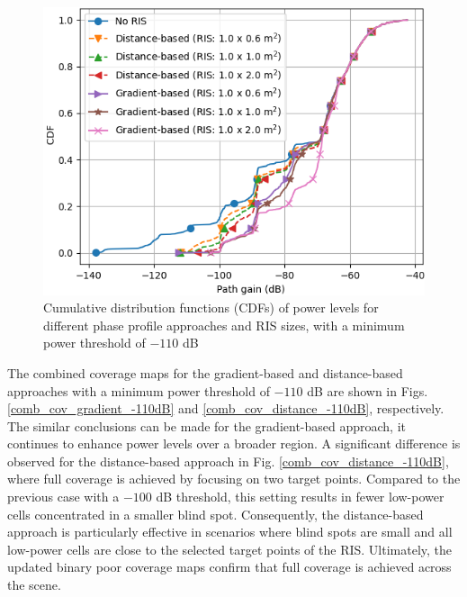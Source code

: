 \documentclass{IEEEoj}
\begin{document}
\begin{figure}
	\centering \includegraphics[width=.9\linewidth]{Sim_Results/CDF_-110dB.png}
	\caption{Cumulative distribution functions (CDFs) of power levels for different phase profile approaches and RIS sizes, with a minimum power threshold of $-110$ dB}
	\label{CDF_-110dB}
\end{figure}

The combined coverage maps for the gradient-based and distance-based approaches with a minimum power threshold of $-110$ dB are shown in Figs. \ref{comb_cov_gradient_-110dB} and \ref{comb_cov_distance_-110dB}, respectively. The similar conclusions can be made for the gradient-based approach, it continues to enhance power levels over a broader region. A significant difference is observed for the distance-based approach in Fig. \ref{comb_cov_distance_-110dB}, where full coverage is achieved by focusing on two target points. Compared to the previous case with a $-100$ dB threshold, this setting results in fewer low-power cells concentrated in a smaller blind spot. Consequently, the distance-based approach is particularly effective in scenarios where blind spots are small and all low-power cells are close to the selected target points of the RIS. Ultimately, the updated binary poor coverage maps confirm that full coverage is achieved across the scene.
\end{document}
